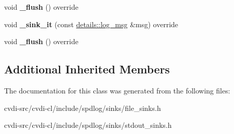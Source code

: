 \begin{DoxyCompactItemize}
\item 
void {\bfseries \+\_\+flush} () override\hypertarget{classspdlog_1_1sinks_1_1SPDLOG__FINAL_a5abffe858401059eeee6619f9d8a376f}{}\label{classspdlog_1_1sinks_1_1SPDLOG__FINAL_a5abffe858401059eeee6619f9d8a376f}

\item 
void {\bfseries \+\_\+sink\+\_\+it} (const \hyperlink{structspdlog_1_1details_1_1log__msg}{details\+::log\+\_\+msg} \&msg) override\hypertarget{classspdlog_1_1sinks_1_1SPDLOG__FINAL_a17212ed6f80d4f2de4eb4ea271c9a86f}{}\label{classspdlog_1_1sinks_1_1SPDLOG__FINAL_a17212ed6f80d4f2de4eb4ea271c9a86f}

\item 
void {\bfseries \+\_\+flush} () override\hypertarget{classspdlog_1_1sinks_1_1SPDLOG__FINAL_a5abffe858401059eeee6619f9d8a376f}{}\label{classspdlog_1_1sinks_1_1SPDLOG__FINAL_a5abffe858401059eeee6619f9d8a376f}

\end{DoxyCompactItemize}
\subsection*{Additional Inherited Members}


The documentation for this class was generated from the following files\+:\begin{DoxyCompactItemize}
\item 
cvdi-\/src/cvdi-\/cl/include/spdlog/sinks/file\+\_\+sinks.\+h\item 
cvdi-\/src/cvdi-\/cl/include/spdlog/sinks/stdout\+\_\+sinks.\+h\end{DoxyCompactItemize}
